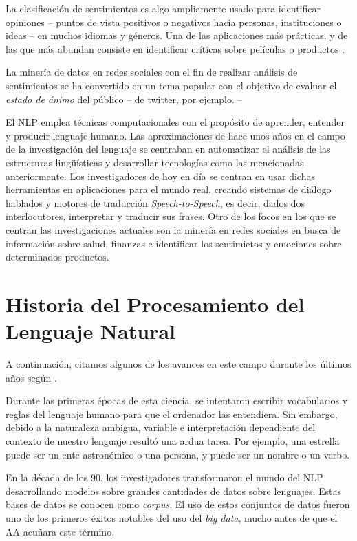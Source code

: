 La clasificación de sentimientos es algo ampliamente usado para identificar
opiniones -- puntos de vista positivos o negativos hacia personas, instituciones
o ideas -- en muchos idiomas y géneros. Una de las aplicaciones más prácticas, y
de las que más abundan consiste en identificar críticas sobre películas o
productos \cite{Pang2002,Wang2014}.

La minería de datos en redes sociales con el fin de realizar análisis de
sentimientos se ha convertido en un tema popular con el objetivo de evaluar el
\emph{estado de ánimo} del público -- de twitter, por ejemplo. -- 

El \ac{NLP} emplea técnicas computacionales con el propósito de aprender,
entender y producir lenguaje humano. Las aproximaciones de hace unos años en el
campo de la investigación del lenguaje se centraban en automatizar el análisis
de las estructuras lingüísticas y desarrollar tecnologías como las mencionadas
anteriormente. Los investigadores de hoy en día se centran en usar dichas
herramientas en aplicaciones para el mundo real, creando sistemas de diálogo
hablados y motores de traducción \emph{Speech-to-Speech}, es decir, dados dos
interlocutores, interpretar y traducir sus frases. Otro de los focos en los que
se centran las investigaciones actuales son la minería en redes sociales en
busca de información sobre salud, finanzas e identificar los sentimietos y
emociones sobre determinados productos.

\section{Historia del Procesamiento del Lenguaje Natural}
\label{sec:currentnlp}

A continuación, citamos algunos de los avances en este campo durante los últimos
años según \citet{Hirschberg2015}.

Durante las primeras épocas de esta ciencia, se intentaron escribir vocabularios
y reglas del lenguaje humano para que el ordenador las entendiera. Sin embargo,
debido a la naturaleza ambigua, variable e interpretación dependiente del
contexto de nuestro lenguaje resultó una ardua tarea. Por ejemplo, una estrella
puede ser un ente astronómico o una persona, y puede ser un nombre o un verbo.

En la década de los 90, los investigadores transformaron el mundo del \ac{NLP}
desarrollando modelos sobre grandes cantidades de datos sobre lenguajes. Estas
bases de datos se conocen como \emph{corpus}. El uso de estos conjuntos de datos
fueron uno de los primeros éxitos notables del uso del \emph{big data}, mucho
antes de que el \ac{AA} acuñara este término.

